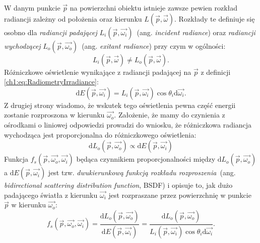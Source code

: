 \begin{itemize}
W danym punkcie $\vec{p}$ na powierzchni obiektu istnieje zawsze pewien rozkład radiancji zależny od położenia oraz kierunku $L(\vec{p}, \vec{\omega})$. Rozkłady te definiuje się osobno dla \textit{radiancji padającej} $L_i(\vec{p}, \vec{\omega_i})$~(ang. \textit{incident radiance}) oraz \textit{radiancji wychodzącej} $L_o(\vec{p}, \vec{\omega_o})$~(ang. \textit{exitant radiance}) przy czym w ogólności:
\begin{equation}
L_i(\vec{p}, \vec{\omega})\neq L_o(\vec{p}, \vec{\omega}).
\end{equation}
Różniczkowe oświetlenie wynikające z radiancji padającej na $\vec{p}$ z definicji \eqref{ch1:eq:RadiometryIrradiance}:
\begin{equation}
\mathrm{d}E(\vec{p},\vec{\omega_i})=L_i(\vec{p}, \vec{\omega_i})\cos\theta_i\mathrm{d}\vec{\omega_i}.
\end{equation}
Z drugiej strony wiadomo, że wskutek tego oświetlenia pewna część energii zostanie rozproszona w kierunku $\vec{\omega_o}$. Założenie, że mamy do czynienia z ośrodkami o liniowej odpowiedzi prowadzi do wniosku, że różniczkowa radiancja wychodząca jest proporcjonalna do różniczkowego oświetlenia:
\begin{equation}
\mathrm{d}L_o(\vec{p}, \vec{\omega_o}) \propto \mathrm{d}E(\vec{p},\vec{\omega_i})
\end{equation}
Funkcja $f_s(\vec{p}, \vec{\omega_o}, \vec{\omega_i})$ będąca czynnikiem proporcjonalności między $\mathrm{d}L_o(\vec{p}, \vec{\omega_o})$ a $\mathrm{d}E(\vec{p},\vec{\omega_i})$ jest tzw. \textit{dwukierunkową funkcją rozkładu rozproszenia}~(ang. \textit{bidirectional scattering distribution function}, BSDF) i opisuje to, jak dużo padającego światła z kierunku $\vec{\omega_i}$ jest rozpraszane przez powierzchnię w punkcie $\vec{p}$ w kierunku $\vec{\omega_o}$:
\begin{equation}
f_s(\vec{p}, \vec{\omega_o}, \vec{\omega_i}) = \frac{\mathrm{d}L_o(\vec{p}, \vec{\omega_o})}{\mathrm{d}E(\vec{p},\vec{\omega_i})} = \frac{\mathrm{d}L_o(\vec{p}, \vec{\omega_o})}{L_i(\vec{p}, \vec{\omega_i})\cos\theta_i\mathrm{d}\vec{\omega_i}}.
\label{ch1:eq:bsdfGeneral}
\end{equation}

\end{itemize}
